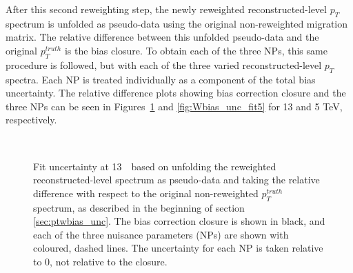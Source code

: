 After this second reweighting step, the newly reweighted reconstructed-level $p_{T}$ spectrum is unfolded as pseudo-data using the original non-reweighted migration matrix. The relative difference between this unfolded pseudo-data and the original $p_{T}^{truth}$ is the bias closure. To obtain each of the three NPs, this same procedure is followed, but with each of the three varied reconstructed-level $p_{T}$ spectra. Each NP is treated individually as a component of the total bias uncertainty. The relative difference plots showing bias correction closure and the three NPs can be seen in Figures~\ref{fig:Wbias_unc_fit13} and \ref{fig:Wbias_unc_fit5} for 13 and 5 TeV, respectively.

\begin{figure}[h]
  \centering
   \\
  \caption{Fit uncertainty at 13~\TeV~based on unfolding the reweighted reconstructed-level \pt spectrum as pseudo-data and taking the relative difference with respect to the original non-reweighted $p_{T}^{truth}$ spectrum, as described in the beginning of section \ref{sec:ptwbias_unc}. The bias correction closure is shown in black, and each of the three nuisance parameters (NPs) are shown with coloured, dashed lines. The uncertainty for each NP is taken relative to 0, not relative to the closure.}
  \label{fig:Wbias_unc_fit13}
\end{figure}

